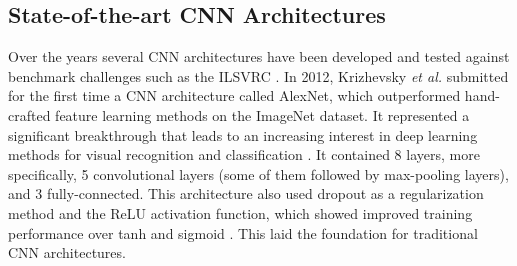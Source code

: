\subsection{State-of-the-art CNN Architectures}
\label{section:cnn_archs}
    Over the years several \ac{CNN} architectures have been developed and tested against benchmark challenges such as the \ac{ILSVRC} \cite{ilsvrc}. In 2012, Krizhevsky \textit{et al.} \cite{alexnet} submitted for the first time a \ac{CNN} architecture called AlexNet, which outperformed hand-crafted feature learning methods on the ImageNet dataset. It represented a significant breakthrough that leads to an increasing interest in deep learning methods for visual recognition and classification \cite{Alom2019}. It contained 8 layers, more specifically, 5 convolutional layers (some of them followed by max-pooling layers), and 3 fully-connected. This architecture also used dropout as a regularization method and the ReLU activation function, which showed improved training performance over tanh and sigmoid \cite{alexnet}. This laid the foundation for traditional \ac{CNN} architectures. \par
    
